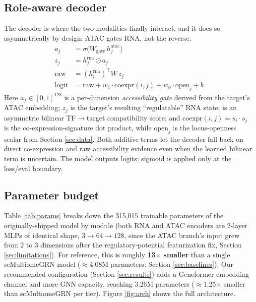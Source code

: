\documentclass{article}
\theoremstyle{plain}
\theoremstyle{definition}
\begin{document}
\subsection{Role-aware decoder}
The decoder is where the two modalities finally interact, and it does so
asymmetrically by design: ATAC gates RNA, not the reverse.
\begin{align}
a_j &= \sigma\big(W_{\text{gate}}\, h^{\text{atac}}_j\big) \\
z_j &= h^{\text{rna}}_j \odot a_j \\
\text{raw} &= (h^{\text{rna}}_i)^{\!\top} W\, z_j \\
\text{logit} &= \text{raw} + w_c \cdot \mathrm{coexpr}(i,j) + w_o \cdot \mathrm{open}_j + b
\end{align}
Here $a_j \in [0,1]^{128}$ is a per-dimension \emph{accessibility gate}
derived from the target's ATAC embedding; $z_j$ is the target's resulting
``regulatable'' RNA state;  is an asymmetric bilinear TF$\to$target
compatibility score; and $\mathrm{coexpr}(i,j) = s_i \cdot s_j$ is the
co-expression-signature dot product, while $\mathrm{open}_j$ is the
locus-openness scalar from Section \ref{sec:data}. Both additive terms let
the decoder fall back on direct co-expression and raw accessibility evidence
even when the learned bilinear term is uncertain. The model outputs logits;
sigmoid is applied only at the loss/eval boundary.

\subsection{Parameter budget}
Table \ref{tab:params} breaks down the 315{,}015 trainable parameters of the
originally-shipped model by module (both RNA and ATAC encoders are 2-layer
MLPs of identical shape, $3\to64\to128$, since the ATAC branch's input grew
from 2 to 3 dimensions after the regulatory-potential featurization fix,
Section \ref{sec:limitations}). For reference, this is roughly
\textbf{13$\times$ smaller} than a single scMultiomeGRN model
($\approx$4.08M parameters; Section \ref{sec:baselines}). Our recommended
configuration (Section \ref{sec:results}) adds a Geneformer embedding
channel and more GNN capacity, reaching 3.26M parameters
($\approx$1.25$\times$ smaller than scMultiomeGRN per tier). Figure
\ref{fig:arch} shows the full architecture.
\end{document}
